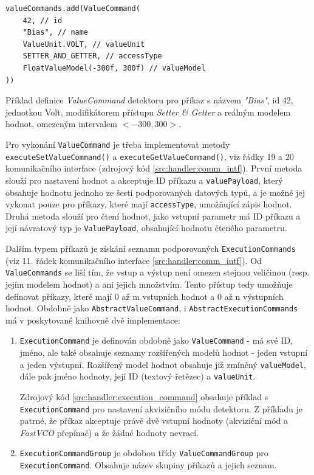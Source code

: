 \begin{verbatim}
valueCommands.add(ValueCommand(
    42, // id
    "Bias", // name
    ValueUnit.VOLT, // valueUnit
    SETTER_AND_GETTER, // accessType
    FloatValueModel(-300f, 300f) // valueModel
))
\end{verbatim}
\begin{code}[h!]
\caption{Příklad definice \textit{ValueCommand} detektoru pro příkaz s názvem \textit{"Bias"}, id 42, jednotkou Volt, modifikátorem přístupu \textit{Setter \& Getter} a reálným modelem hodnot, omezeným intervalem $<-300,300>$.}
\label{src:handler:value_command}
\end{code}

Pro vykonání \texttt{ValueCommand} je třeba implementovat metody \texttt{executeSetValueCommand()} a \texttt{executeGetValueCommand()}, viz řádky 19 a 20 komunikačního interface (zdrojový kód \ref{src:handler:comm_intf}). První metoda slouží pro nastavení hodnot a akceptuje ID příkazu a \texttt{valuePayload}, který obsahuje hodnotu jednoho ze šesti podporovaných datových typů, a je možné jej vykonat pouze pro příkazy, které mají \texttt{accessType}, umožňující zápis hodnot. Druhá metoda slouží pro čtení hodnot, jako vstupní parametr má ID příkazu a její návratový typ je \texttt{ValuePayload}, obsahující hodnotu čteného parametru.

Dalším typem příkazů je získání seznamu podporovaných \texttt{ExecutionCommands} (viz 11. řádek komunikačního interface \ref{src:handler:comm_intf}). Od \texttt{ValueCommands} se liší tím, že vstup a výstup není omezen stejnou veličinou (resp. jejím modelem hodnot) a ani jejich množstvím. Tento přístup tedy umožňuje definovat příkazy, které mají 0 až m vstupních hodnot a 0 až n výstupních hodnot. Obdobně jako \texttt{AbstractValueCommand}, i \texttt{AbstractExecutionCommands} má v poskytované knihovně dvě implementace:
\begin{enumerate}[label=(\roman*)]
	\item \texttt{ExecutionCommand} je definován obdobně jako \texttt{ValueCommand} - má své ID, jméno, ale také obsahuje seznamy rozšířených modelů hodnot - jeden vstupní a jeden výstupní. Rozšířený model hodnot obsahuje již zmíněný \texttt{valueModel}, dále pak jméno hodnoty, její ID (textový řetězec) a \texttt{valueUnit}.
	
	Zdrojový kód \ref{src:handler:execution_command} obsahuje příklad s \texttt{ExecutionCommand} pro nastavení akvizičního módu detektoru. Z příkladu je patrné, že příkaz akceptuje právě dvě vstupní hodnoty (akviziční mód a \textit{FastVCO} přepínač) a že žádné hodnoty nevrací.
	
	\item \texttt{ExecutionCommandGroup} je obdobou třídy \texttt{ValueCommandGroup} pro \texttt{ExecutionCommand}. Obsahuje název skupiny příkazů a jejich seznam.
\end{enumerate}

